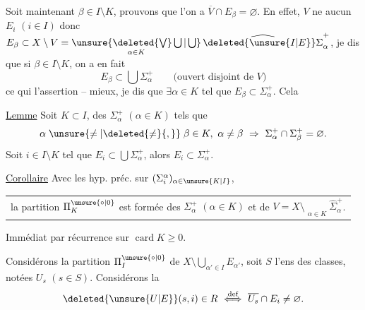 Soit maintenant $\beta\in I\setminus K$, prouvons que l'on a $\overline V\cap E_\beta=\varnothing$. En effet, $V$ ne   aucun $E_i$ $(i\in I)$ donc $E_\beta\subset X\setminus V=\mathop{\unsure{\deleted{\bigvee}\bigcup|\bigcup}}\limits_{\alpha\in K}\widehat{\deleted{\unsure{I|E}}\Sigma}_\alpha^+$,  je dis que si $\beta\in I\setminus K$, on a en fait
\[
E_\beta\subset\bigcup\Sigma_\alpha^+\qquad\text{(ouvert disjoint de }V\text{)}
\]
\reversemarginpar{}\normalmarginpar
ce qui  l'assertion -- mieux, je dis que $\exists\alpha\in K$ tel que $E_\beta\subset\Sigma_\alpha^+$. Cela  

\uline{Lemme} Soit $K\subset I$,   des $\Sigma_\alpha^+$ $(\alpha\in K)$ tels que
\[
\alpha\mathrel{\unsure{\ne|\deleted{\ne}{,}}}\beta\in K,\ \alpha\ne\beta\ \Rightarrow\ \Sigma_\alpha^+\cap\Sigma_\beta^+=\varnothing.
\]
Soit $i\in I\setminus K$ tel que $E_i\subset\bigcup\Sigma_\alpha^+$, alors   $E_i\subset\Sigma_\alpha^+$.

   

\uline{Corollaire} Avec les hyp. préc. sur $(\Sigma_i^\alpha)_{\alpha\in\unsure{K|I}}$,

\noindent\begin{tabular}{@{}|p{.96\linewidth}@{}}
la partition $\Pi_K^{\unsure{\circ|0}}$ est formée des $\Sigma_\alpha^+$ $(\alpha\in K)$ et de $V=X\setminus\mathop{\overline{\bigcup}}\limits_{\alpha\in K}\widehat{\Sigma}_\alpha^+$.
\end{tabular}

Immédiat par récurrence sur $\operatorname{card} K\geq 0$.

Considérons la partition $\Pi_I^{\unsure{\circ|0}}$ de $X\setminus\bigcup_{\alpha'\in I}E_{\alpha'}$, soit $S$ l'ens des classes, notées $U_s$ $(s\in S)$.  Considérons la  
\[
\deleted{\unsure{U|E}}(s,i)\in R\ \overset{\text{def}}{\Longleftrightarrow}\ \overline{U_s}\cap E_i\ne\varnothing.
\]

